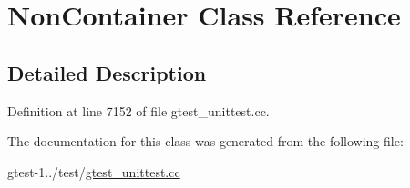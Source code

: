 \hypertarget{classNonContainer}{\section{\-Non\-Container \-Class \-Reference}
\label{d9/d45/classNonContainer}
}


\subsection{\-Detailed \-Description}


\-Definition at line 7152 of file gtest\-\_\-unittest.\-cc.



\-The documentation for this class was generated from the following file\-:\begin{DoxyCompactItemize}
\item 
gtest-\/1../test/\hyperlink{gtest__unittest_8cc}{gtest\-\_\-unittest.\-cc}\end{DoxyCompactItemize}
